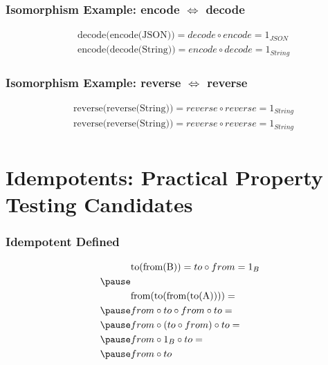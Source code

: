 \documentclass{beamer}
\begin{document}
\begin{frame}[fragile]
\frametitle{Isomorphism Example: encode {$\iff$} decode}
\medskip
\begin{equation*}
\begin{aligned}
& \text{decode(encode(JSON))} = decode \circ encode = 1_{JSON} \\
& \text{encode(decode(String))} = encode \circ decode = 1_{String}
\end{aligned}
\end{equation*}
\end{frame}

\begin{frame}[fragile]
\frametitle{Isomorphism Example: reverse {$\iff$} reverse}
\medskip
\begin{equation*}
\begin{aligned}
& \text{reverse(reverse(String))} = reverse \circ reverse = 1_{String} \\
& \text{reverse(reverse(String))} = reverse \circ reverse = 1_{String} \\
\end{aligned}
\end{equation*}
\end{frame}

\section{Idempotents: Practical Property Testing Candidates}
\begin{frame}[fragile]
\frametitle{Idempotent Defined}
\medskip
\begin{equation*}
\begin{aligned}
& \text{to(from(B))} = to \circ from = 1_B \\ \pause
& \\
& \text{from(to(from(to(A))))} = \\ \pause
& from \circ to \circ from \circ to = \\ \pause
& from \circ (to \circ from) \circ to = \\ \pause
& from \circ 1_B \circ to = \\ \pause
& from \circ to \\
\end{aligned}
\end{equation*}
\end{frame}
\end{document}
